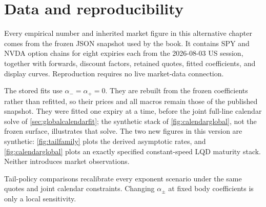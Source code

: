 \section{Data and reproducibility}
\label{app:data}

Every empirical number and inherited market figure in this alternative chapter
comes from the frozen JSON snapshot used by the book.  It contains SPY and
NVDA option chains for eight expiries each from the 2026-08-03 US session,
together with forwards, discount factors, retained quotes, fitted coefficients,
and display curves.  Reproduction requires no live market-data connection.

The stored fits use $\alpha_-=\alpha_+=0$.  They are rebuilt from the frozen
coefficients rather than refitted, so their prices and all macros remain those
of the published snapshot.  They were fitted one expiry at a time, before the
joint full-line calendar solve of \cref{sec:globalcalendarfit}; the synthetic
stack of \cref{fig:calendarglobal}, not the frozen surface, illustrates that
solve.  The two new figures in this version are synthetic:
\cref{fig:tailfamily} plots the derived asymptotic rates, and
\cref{fig:calendarglobal} plots an exactly specified constant-speed LQD
maturity stack.  Neither introduces market observations.

Tail-policy comparisons recalibrate every exponent scenario under the same
quotes and joint calendar constraints.  Changing $\alpha_\pm$ at fixed body
coefficients is only a local sensitivity.
